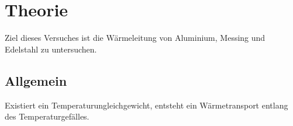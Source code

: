 \section{Theorie}
\label{sec:Theorie}
 
Ziel dieses Versuches ist die Wärmeleitung von Aluminium, Messing und Edelstahl zu untersuchen.

\subsection{Allgemein}

Existiert ein Temperaturungleichgewicht, entsteht ein Wärmetransport entlang des Temperaturgefälles. 

